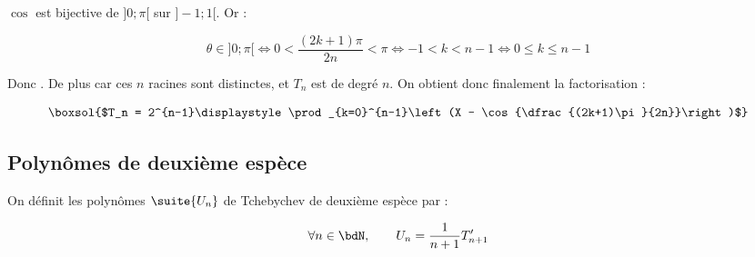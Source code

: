 \documentclass[a4paper,french,bookmarks]{article}
\begin{document}
\begin{enumerate}
{        $\cos$ est bijective de $]0; \pi[$ sur $]-1; 1[$. Or :
        
        \[ \theta \in ]0; \pi[ \iff 0 < \dfrac{(2k+1)\pi}{2n} < \pi \iff -1 < k < n-1 \iff 0 \leq k \leq n-1\]
        
        Donc \boxsol{$\forall k \in \llbracket0, n-1\rrbracket$, $\cos{\dfrac{(2k+1)\pi}{2n}} \in ]-1;1[$ est racine de $T_n$}. De plus  car ces $n$ racines sont distinctes, et $T_n$ est de degré $n$. On obtient donc finalement la factorisation :
        
        \[ \boxsol{$T_n = 2^{n-1}\displaystyle\prod_{k=0}^{n-1}\left(X - \cos{\dfrac{(2k+1)\pi}{2n}}\right)$} \]
    }  
    
\end{enumerate}

\newpage
\subsection{Polynômes de deuxième espèce}

On définit les polynômes $\suite{U_n}$ de Tchebychev de deuxième espèce par :

\begin{equation}
     \forall n \in \bdN,\qquad U_n = \dfrac{1}{n+1}T'_{n+1}
\end{equation}
\end{document}
